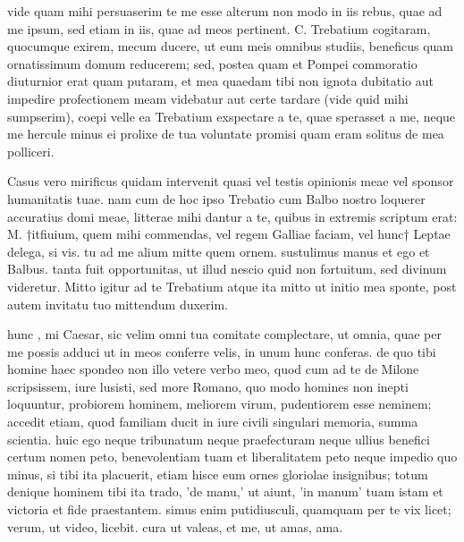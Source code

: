 


 vide quam mihi persuaserim te me esse alterum non modo in iis rebus, quae ad me ipsum, sed etiam in iis, quae ad meos pertinent. C. Trebatium cogitaram, quocumque exirem, mecum ducere, ut eum meis omnibus studiis, beneficus quam ornatissimum domum reducerem; sed, postea quam et Pompei commoratio diuturnior erat quam putaram, et mea quaedam tibi non ignota dubitatio aut impedire profectionem meam videbatur aut certe tardare (vide quid mihi sumpserim), coepi velle ea Trebatium exspectare a te, quae sperasset a me, neque me hercule minus ei prolixe de tua voluntate promisi quam eram solitus de mea polliceri.

 Casus vero mirificus quidam intervenit quasi vel testis opinionis meae vel sponsor humanitatis tuae. nam cum de hoc ipso Trebatio cum Balbo nostro loquerer accuratius domi meae, litterae mihi dantur a te, quibus in extremis scriptum erat: M. †itfiuium, quem mihi commendas, vel regem Galliae faciam, vel hunc† Leptae delega, si vis. tu ad me alium mitte quem ornem. sustulimus manus et ego et Balbus. tanta fuit opportunitas, ut illud nescio quid non fortuitum, sed divinum videretur. Mitto igitur ad te Trebatium atque ita mitto ut initio mea sponte, post autem invitatu tuo mittendum duxerim.

 hunc , mi Caesar, sic velim omni tua comitate complectare, ut omnia, quae per me possis adduci ut in meos conferre velis, in unum hunc conferas. de quo tibi homine haec spondeo non illo vetere verbo meo, quod cum ad te de Milone scripsissem, iure lusisti, sed more Romano, quo modo homines non inepti loquuntur, probiorem hominem, meliorem virum, pudentiorem esse neminem; accedit etiam, quod familiam ducit in iure civili singulari memoria, summa scientia. huic ego neque tribunatum neque praefecturam neque ullius benefici certum nomen peto, benevolentiam tuam et liberalitatem peto neque impedio quo minus, si tibi ita placuerit, etiam hisce eum ornes gloriolae insignibus; totum denique hominem tibi ita trado, 'de manu,' ut aiunt, 'in manum' tuam istam et victoria et fide praestantem. simus enim putidiusculi, quamquam per te vix licet; verum, ut video, licebit. cura ut valeas, et me, ut amas, ama.
